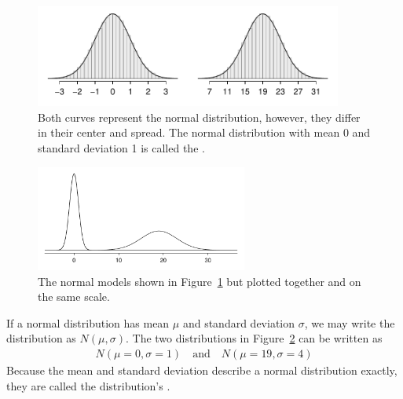 \begin{figure}[hht]
\centering
\includegraphics[width=0.9\textwidth]{02/figures/twoSampleNormals/twoSampleNormals}
\caption{Both curves represent the normal distribution, however, they differ in their center and spread. The normal distribution with mean 0 and standard deviation 1 is called the .}
\label{twoSampleNormals}
\end{figure}

\begin{figure}[hht]
\centering
\includegraphics[width=0.62\textwidth]{02/figures/twoSampleNormalsStacked/twoSampleNormalsStacked}
\caption{The normal models shown in Figure~\ref{twoSampleNormals} but plotted together and on the same scale.}
\label{twoSampleNormalsStacked}
\end{figure}

If a normal distribution has mean $\mu$ and standard deviation $\sigma$, we may write the distribution as $N(\mu, \sigma)$. The two distributions in Figure~\ref{twoSampleNormalsStacked} can be written as
\begin{align*}
N(\mu=0,\sigma=1)\quad\text{and}\quad N(\mu=19,\sigma=4)
\end{align*}
Because the mean and standard deviation describe a normal distribution exactly, they are called the distribution's .

